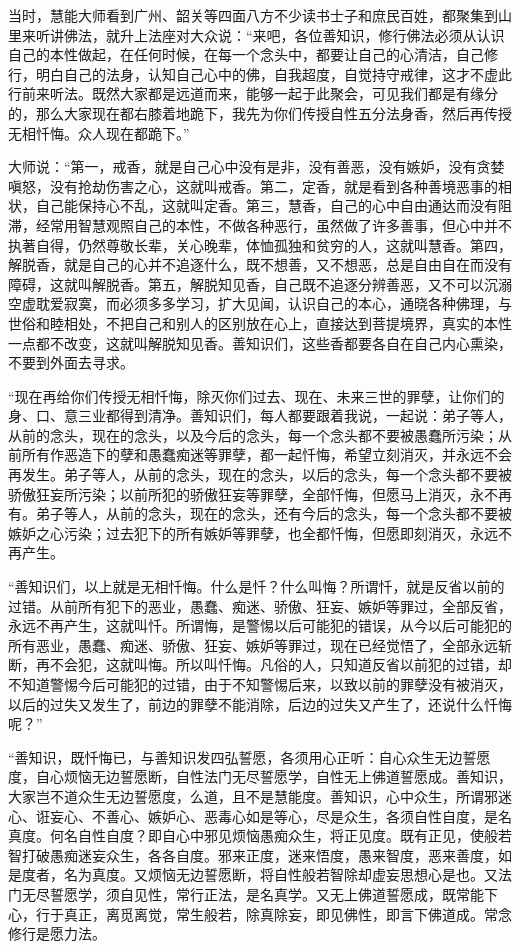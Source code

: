 \documentclass[12pt,twoside,openany]{book}
\newcommand{\kai}[1]{{\CJKfamily{kai}#1}}
\begin{document}
\kai{当时，慧能大师看到广州、韶关等四面八方不少读书士子和庶民百姓，都聚集到山里来听讲佛法，就升上法座对大众说：“来吧，各位善知识，修行佛法必须从认识自己的本性做起，在任何时候，在每一个念头中，都要让自己的心清洁，自己修行，明白自己的法身，认知自己心中的佛，自我超度，自觉持守戒律，这才不虚此行前来听法。既然大家都是远道而来，能够一起于此聚会，可见我们都是有缘分的，那么大家现在都右膝着地跪下，我先为你们传授自性五分法身香，然后再传授无相忏悔。众人现在都跪下。”
	
大师说：“第一，戒香，就是自己心中没有是非，没有善恶，没有嫉妒，没有贪婪嗔怒，没有抢劫伤害之心，这就叫戒香。第二，定香，就是看到各种善境恶事的相状，自己能保持心不乱，这就叫定香。第三，慧香，自己的心中自由通达而没有阻滞，经常用智慧观照自己的本性，不做各种恶行，虽然做了许多善事，但心中并不执著自得，仍然尊敬长辈，关心晚辈，体恤孤独和贫穷的人，这就叫慧香。第四，解脱香，就是自己的心并不追逐什么，既不想善，又不想恶，总是自由自在而没有障碍，这就叫解脱香。第五，解脱知见香，自己既不追逐分辨善恶，又不可以沉溺空虚耽爱寂寞，而必须多多学习，扩大见闻，认识自己的本心，通晓各种佛理，与世俗和睦相处，不把自己和别人的区别放在心上，直接达到菩提境界，真实的本性一点都不改变，这就叫解脱知见香。善知识们，这些香都要各自在自己内心熏染，不要到外面去寻求。

“现在再给你们传授无相忏悔，除灭你们过去、现在、未来三世的罪孽，让你们的身、口、意三业都得到清净。善知识们，每人都要跟着我说，一起说：弟子等人，从前的念头，现在的念头，以及今后的念头，每一个念头都不要被愚蠢所污染；从前所有作恶造下的孽和愚蠢痴迷等罪孽，都一起忏悔，希望立刻消灭，并永远不会再发生。弟子等人，从前的念头，现在的念头，以后的念头，每一个念头都不要被骄傲狂妄所污染；以前所犯的骄傲狂妄等罪孽，全部忏悔，但愿马上消灭，永不再有。弟子等人，从前的念头，现在的念头，还有今后的念头，每一个念头都不要被嫉妒之心污染；过去犯下的所有嫉妒等罪孽，也全都忏悔，但愿即刻消灭，永远不再产生。

“善知识们，以上就是无相忏悔。什么是忏？什么叫悔？所谓忏，就是反省以前的过错。从前所有犯下的恶业，愚蠢、痴迷、骄傲、狂妄、嫉妒等罪过，全部反省，永远不再产生，这就叫忏。所谓悔，是警惕以后可能犯的错误，从今以后可能犯的所有恶业，愚蠢、痴迷、骄傲、狂妄、嫉妒等罪过，现在已经觉悟了，全部永远斩断，再不会犯，这就叫悔。所以叫忏悔。凡俗的人，只知道反省以前犯的过错，却不知道警惕今后可能犯的过错，由于不知警惕后来，以致以前的罪孽没有被消灭，以后的过失又发生了，前边的罪孽不能消除，后边的过失又产生了，还说什么忏悔呢？”}

“善知识，既忏悔已，与善知识发四弘誓愿，各须用心正听：{\color{red}自心众生无边誓愿度，自心烦恼无边誓愿断，自性法门无尽誓愿学，自性无上佛道誓愿成。}善知识，大家岂不道众生无边誓愿度，么道，且不是慧能度。善知识，心中众生，所谓邪迷心、诳妄心、不善心、嫉妒心、恶毒心如是等心，尽是众生，各须自性自度，是名真度。何名自性自度？即自心中邪见烦恼愚痴众生，将正见度。既有正见，使般若智打破愚痴迷妄众生，各各自度。邪来正度，迷来悟度，愚来智度，恶来善度，如是度者，名为真度。又烦恼无边誓愿断，将自性般若智除却虚妄思想心是也。又法门无尽誓愿学，须自见性，常行正法，是名真学。又无上佛道誓愿成，既常能下心，行于真正，离觅离觉，常生般若，除真除妄，即见佛性，即言下佛道成。常念修行是愿力法。
\end{document}

